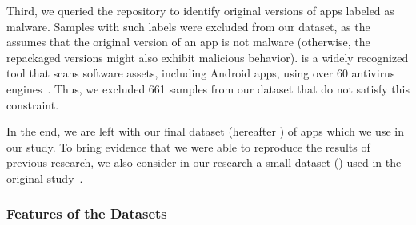 Third, we queried the \vt repository
to identify original versions of apps labeled as malware. Samples with such labels were excluded from our dataset,
as the \mas assumes that the original version of an app is not malware (otherwise, the repackaged versions might
also exhibit malicious behavior). \vt is a widely recognized tool that scans software assets, including Android apps,
using over 60 antivirus engines~\cite{DBLP:journals/ese/KhanmohammadiEH19}. Thus, we excluded 661 samples from our dataset that
do not satisfy this constraint.

In the end, we are left with our final dataset (hereafter \cds) of \apps apps which we use in our study. 
To bring evidence that we were able to reproduce the results of previous research, we also consider in our research
a small dataset (\sds) used in the original study~\cite{DBLP:conf/wcre/BaoLL18}.







\subsubsection{Features of the Datasets}
 
